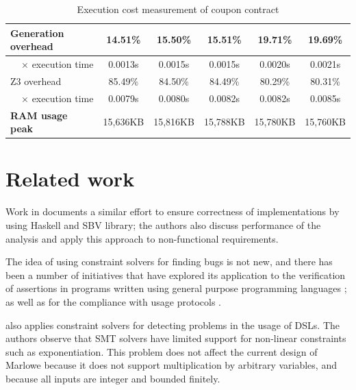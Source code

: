 \documentclass[english,runningheads]{llncs}
\begin{document}
\begin{table}[]
{\begin{tabular}{l||lllll}
Generation overhead                    & \multicolumn{1}{c|}{14.51\%}  & \multicolumn{1}{c|}{15.50\%}  & \multicolumn{1}{c|}{15.51\%}  & \multicolumn{1}{c|}{19.71\%}  & \multicolumn{1}{c}{19.69\%} \\ \hline
\multicolumn{1}{r||}{× execution time} & \multicolumn{1}{c|}{0.0013s}  & \multicolumn{1}{c|}{0.0015s}  & \multicolumn{1}{c|}{0.0015s}  & \multicolumn{1}{c|}{0.0020s}  & \multicolumn{1}{c}{0.0021s} \\ \hline
Z3 overhead                            & \multicolumn{1}{c|}{85.49\%}  & \multicolumn{1}{c|}{84.50\%}  & \multicolumn{1}{c|}{84.49\%}  & \multicolumn{1}{c|}{80.29\%}  & \multicolumn{1}{c}{80.31\%} \\ \hline
\multicolumn{1}{r||}{× execution time} & \multicolumn{1}{c|}{0.0079s}  & \multicolumn{1}{c|}{0.0080s}  & \multicolumn{1}{c|}{0.0082s}  & \multicolumn{1}{c|}{0.0082s}  & \multicolumn{1}{c}{0.0085s} \\ \hline
\textbf{RAM usage peak}                & \multicolumn{1}{c|}{15,636KB} & \multicolumn{1}{c|}{15,816KB} & \multicolumn{1}{c|}{15,788KB} & \multicolumn{1}{c|}{15,780KB} & \multicolumn{1}{c}{15,760KB}
\end{tabular}
}
\caption{Execution cost measurement of coupon contract\label{table4}}
\end{table}

\section{Related work}

Work in \cite{mokhov2019formal} documents a similar effort to ensure
correctness of implementations by using Haskell and SBV library; the
authors also discuss performance of the analysis and apply this approach
to non-functional requirements.

The idea of using constraint solvers for finding bugs is not new,
and there has been a number of initiatives that have explored its
application to the verification of assertions in programs written
using general purpose programming languages \cite{gulwani2008program,jackson2000finding};
as well as for the compliance with usage protocols
\cite{ball2001automatically,xie2005saturn}.

\cite{keshishzadeh2013early} also applies constraint solvers for
detecting problems in the usage of DSLs. The authors observe that
SMT solvers have limited support for non-linear constraints such as
exponentiation. This problem does not affect the current design of
Marlowe because it does not support multiplication by arbitrary variables,
and because all inputs are integer and bounded finitely.
\end{document}
